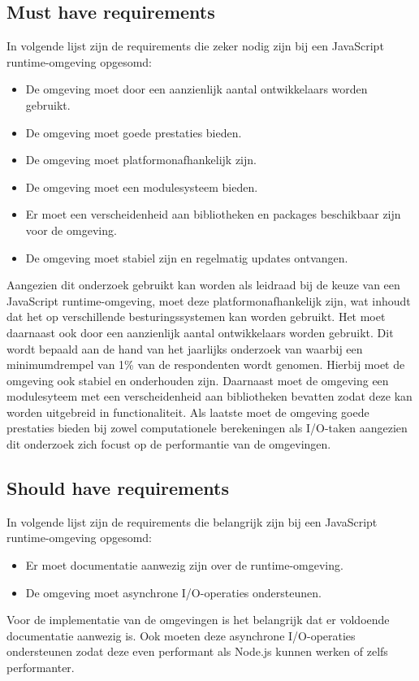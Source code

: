\subsection{Must have requirements}
In volgende lijst zijn de requirements die zeker nodig zijn bij een JavaScript runtime-omgeving opgesomd:
\begin{itemize}
    \item De omgeving moet door een aanzienlijk aantal ontwikkelaars worden gebruikt.
    \item De omgeving moet goede prestaties bieden.
    \item De omgeving moet platformonafhankelijk zijn.
    \item De omgeving moet een modulesysteem bieden.
    \item Er moet een verscheidenheid aan bibliotheken en packages beschikbaar zijn voor de omgeving.
    \item De omgeving moet stabiel zijn en regelmatig updates ontvangen.
\end{itemize}
Aangezien dit onderzoek gebruikt kan worden als leidraad bij de keuze van een JavaScript runtime-omgeving, 
moet deze platformonafhankelijk zijn, wat inhoudt dat het op verschillende besturingssystemen kan worden gebruikt.
Het moet daarnaast ook door een aanzienlijk aantal ontwikkelaars worden gebruikt.
Dit wordt bepaald aan de hand van het jaarlijks onderzoek van \textcite{Greif2022} 
waarbij een minimumdrempel van 1\% van de respondenten wordt genomen.
Hierbij moet de omgeving ook stabiel en onderhouden zijn.
Daarnaast moet de omgeving een modulesyteem met een verscheidenheid aan bibliotheken bevatten 
zodat deze kan worden uitgebreid in functionaliteit. 
Als laatste moet de omgeving goede prestaties bieden bij zowel computationele berekeningen als I/O-taken
aangezien dit onderzoek zich focust op de performantie van de omgevingen.

\subsection{Should have requirements}
In volgende lijst zijn de requirements die belangrijk zijn bij een JavaScript runtime-omgeving opgesomd:
\begin{itemize}
    \item Er moet documentatie aanwezig zijn over de runtime-omgeving.
    \item De omgeving moet asynchrone I/O-operaties ondersteunen.
\end{itemize}
Voor de implementatie van de omgevingen is het belangrijk dat er voldoende documentatie aanwezig is.
Ook moeten deze asynchrone I/O-operaties ondersteunen zodat deze even performant als Node.js kunnen werken of zelfs performanter.


